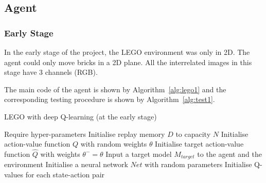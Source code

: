 \documentclass[a4paper]{article}
\begin{document}
        
        
        \subsection{Agent}
	        \subsubsection{Early Stage}
		        In the early stage of the project, the LEGO environment was only in 2D. The agent could only move bricks in a 2D plane. All the interrelated images in this stage have 3 channels (RGB).
		        
		        The main code of the agent is shown by Algorithm~\ref{alg:lego1} and the corresponding testing procedure is shown by Algorithm~\ref{alg:test1}. 
		        
		        \begin{algorithm}[]
		        	\caption{LEGO with deep Q-learning (at the early stage)} \label{alg:lego1}
		        	\begin{algorithmic}[1]
		        		\State Require hyper-parameters
		        		\State Initialise replay memory $D$ to capacity $N$
		        		\State Initialise action-value function $Q$ with random weights $\theta$
		        		\State Initialise target action-value function $\hat{Q}$ with weights $\theta^- = \theta$
		        		\State Input a target model $M_{target}$ to the agent and the environment
		        		\State Initialise a neural network $Net$ with random parameters
		        		\State Initialise Q-values for each state-action pair
		        		

\end{algorithmic}
\end{algorithm}
\end{document}

